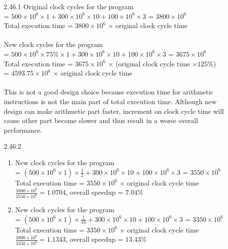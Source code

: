 \documentclass[12pt, a4paper]{article}
\begin{document}
\begin{itemize}[font=\bfseries]
\newpage
\item[2.46.1]
Original clock cycles for the program \\ = $500 \times 10^6 \times 1 + 300 \times 10^6 \times 10 + 100 \times 10^6 \times 3$ = $3800 \times 10^6$ \\
Total execution time = $3800 \times 10^6$ $\times$ original clock cycle time \\ 
\vspace*{-0.3cm} \\
New clock cycles for the program \\ = $500 \times 10^6 \times 75\% \times 1 + 300 \times 10^6 \times 10 + 100 \times 10^6 \times 3$ = $3675 \times 10^6$ \\
Total execution time = $3675 \times 10^6$ $\times$ (original clock cycle time $\times 125\%$) \\ = $4593.75 \times 10^6$ $\times$ original clock cycle time\\ 
\vspace*{-0.3cm} \\
This is not a good design choice because execution time for arithmetic instructions is not the main part of total execution time. Although new design can make arithmetic part faster, increment on clock cycle time will cause other part become slower and thus result in a worse overall performance.

\item[2.46.2]
\begin{enumerate}
\item
New clock cycles for the program \\ = $(500 \times 10^6 \times 1) \times \frac{1}{2} + 300 \times 10^6 \times 10 + 100 \times 10^6 \times 3$ = $3550 \times 10^6$ \\
Total execution time = $3550 \times 10^6$ $\times$ original clock cycle time \\ 
$\frac{3800 \times 10^6}{3550 \times 10^6} = 1.0704$, overall speedup = $7.04\%$ 

\item
New clock cycles for the program \\ = $(500 \times 10^6 \times 1) \times \frac{1}{10} + 300 \times 10^6 \times 10 + 100 \times 10^6 \times 3$ = $3350 \times 10^6$ \\
Total execution time = $3350 \times 10^6$ $\times$ original clock cycle time \\ 
$\frac{3800 \times 10^6}{3350 \times 10^6} = 1.1343$, overall speedup = $13.43\%$ 
\end{enumerate}


\end{itemize}
\end{document}
